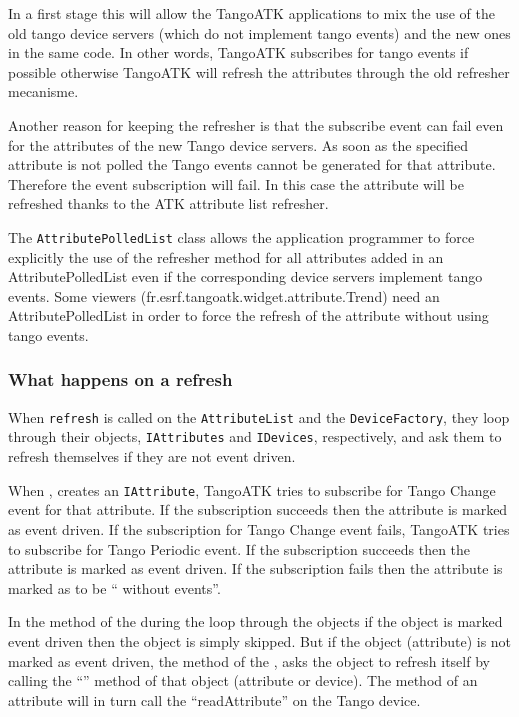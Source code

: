 In a first stage this will allow the TangoATK applications to mix
the use of the old tango device servers (which do not implement tango
events) and the new ones in the same code. In other words, TangoATK
subscribes for tango events if possible otherwise TangoATK will refresh
the attributes through the old refresher mecanisme.

Another reason for keeping the refresher is that the subscribe event
can fail even for the attributes of the new Tango device servers.
As soon as the specified attribute is not polled the Tango events
cannot be generated for that attribute. Therefore the event subscription
will fail. In this case the attribute will be refreshed thanks to
the ATK attribute list refresher.

The \texttt{AttributePolledList} class allows the application programmer
to force explicitly the use of the refresher method for all attributes
added in an AttributePolledList even if the corresponding device servers
implement tango events. Some viewers (fr.esrf.tangoatk.widget.attribute.Trend)
need an AttributePolledList in order to force the refresh of the attribute
without using tango events.


\subsubsection{What happens on a refresh}

When \texttt{refresh} is called on the \texttt{AttributeList}
and the \texttt{DeviceFactory}, they loop through their objects, \texttt{IAttributes}
and \texttt{IDevices}, respectively, and ask them to refresh themselves
if they are not event driven.

When , creates an \texttt{IAttribute}, TangoATK
tries to subscribe for Tango Change event for that attribute. If the
subscription succeeds then the attribute is marked as event driven.
If the subscription for Tango Change event fails, TangoATK tries to
subscribe for Tango Periodic event. If the subscription succeeds then
the attribute is marked as event driven. If the subscription fails
then the attribute is marked as to be `` without events''.

In the  method of the  during
the loop through the objects if the object is marked event driven
then the object is simply skipped. But if the object (attribute) is
not marked as event driven, the  method of the ,
asks the object to refresh itself by calling the ``''
method of that object (attribute or device). The 
method of an attribute will in turn call the ``readAttribute'' on
the Tango device.

